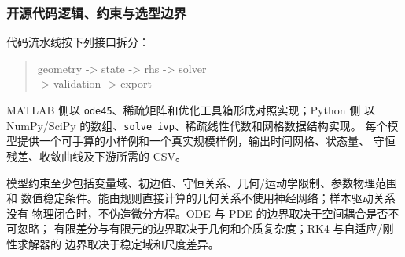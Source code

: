 \subsubsection{开源代码逻辑、约束与选型边界}

代码流水线按下列接口拆分：
\begin{quote}
\small\ttfamily
geometry -> state -> rhs -> solver\\
-> validation -> export
\end{quote}
MATLAB 侧以 \texttt{ode45}、稀疏矩阵和优化工具箱形成对照实现；Python 侧
以 NumPy/SciPy 的数组、\texttt{solve\_ivp}、稀疏线性代数和网格数据结构实现。
每个模型提供一个可手算的小样例和一个真实规模样例，输出时间网格、状态量、
守恒残差、收敛曲线及下游所需的 CSV。

模型约束至少包括变量域、初边值、守恒关系、几何/运动学限制、参数物理范围和
数值稳定条件。能由规则直接计算的几何关系不使用神经网络；样本驱动关系没有
物理闭合时，不伪造微分方程。ODE 与 PDE 的边界取决于空间耦合是否不可忽略；
有限差分与有限元的边界取决于几何和介质复杂度；RK4 与自适应/刚性求解器的
边界取决于稳定域和尺度差异。

